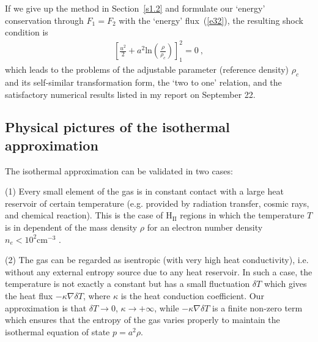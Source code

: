 \documentclass[fleqn,usenatbib]{mnras}
\begin{document}
If we give up the method in Section~\ref{s1.2} and formulate our `energy' conservation through $F_{1}=F_{2}$ with the `energy' flux~(\ref{e32}), the resulting shock condition is
\begin{gather}
\left[\frac{u^{2}}{2}+a^{2}\mathrm{ln}\left(\frac{\rho}{\rho_{c}}\right)\right]_{1}^{2}=0\ ,\label{e40}
\end{gather}
which leads to the problems of the adjustable parameter (reference density) $\rho_{c}$ and its self-similar transformation form, the `two to one' relation, and the satisfactory numerical results listed in my report on September 22. 

\subsection{Physical pictures of the isothermal approximation}

The isothermal approximation can be validated in two cases: 

(1) Every small element of the gas is in constant contact with a large heat reservoir of certain temperature (e.g. provided by radiation transfer, cosmic rays, and chemical reaction). This is the case of $\mathrm{H_{II}}$ regions in which the temperature $T$ is in dependent of the mass density $\rho$ for an electron number density $n_{e}<10^2\mathrm{cm^{-3}}$ \citep{spitzer}.

(2) The gas can be regarded as isentropic (with very high heat conductivity), i.e. without any external entropy source due to any heat reservoir. In such a case, the temperature is not exactly a constant but has a small fluctuation $\delta T$ which gives the heat flux $-\kappa \nabla \delta T$, where $\kappa$ is the heat conduction coefficient. Our approximation is that $\delta T\rightarrow 0$, $\kappa\rightarrow+\infty$, while $-\kappa \nabla \delta T$ is a finite non-zero term which ensures that the entropy of the gas varies properly to maintain the isothermal equation of state $p=a^{2}\rho$. 
\end{document}
